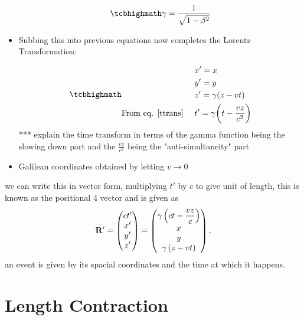 \begin{itemize}
\begin{equation}%
\mhl{
    \gamma= \frac{1}{\sqrt{1-\beta^2}}
    }
\end{equation}%

\item Subbing this into previous equations now completes the Lorentz Transformation:

\begin{equation}%
\label{lorentz transformation 2}
\mhl{
    \begin{aligned}
      &  x'=x \\ & y'=y \\ &z' = \gamma (z-vt)  \\
       \text{From eq. \eqref{ttrans} \ \ \ } & t'=\gamma \bigg(t-\frac{vz}{c^2}\bigg)
    \end{aligned}
    }
\end{equation}%
*** explain the time transform in terms of the gamma function being the slowing down part and the $\frac{vz}{c^2}$ being the "anti-simultaneity" part
\item Galilean coordinates obtained by letting $v\rightarrow 0$
\end{itemize}
we can write this in vector form, multiplying $t'$ by $c$ to give unit of length, this is known as the positional 4 vector and is given as
\begin{equation}%
\label{spacial transform}
    \bf{R}'= \begin{pmatrix}
    ct' \\ x'\\ y' \\ z'
    \end{pmatrix} = \begin{pmatrix}
    \gamma\left( ct - \dfrac{vz}{c} \right) \\x\\ y \\ \gamma \left( z - vt \right)\\
    \end{pmatrix}.
\end{equation}%
an event is given by its spacial coordinates and the time at which it happens.

\section{Length Contraction}
